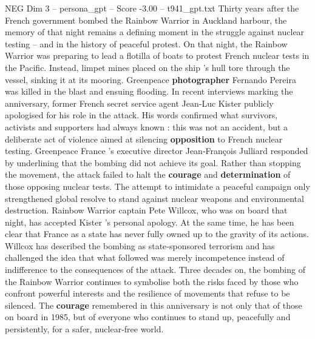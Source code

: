 \begin{textsample}{NEG Dim 3 – persona\_gpt – Score -3.00 – t941\_gpt.txt}  \label{ex:f3_neg_031}
Thirty years after the French government bombed the Rainbow Warrior in Auckland harbour, the memory of that night remains a defining moment in the struggle against nuclear testing – and in the history of peaceful protest.
On that night, the Rainbow Warrior was preparing to lead a flotilla of boats to protest French nuclear tests in the Pacific.
Instead, limpet mines placed on the ship ’s hull tore through the vessel, sinking it at its mooring.
Greenpeace \textbf{photographer} Fernando Pereira was killed in the blast and ensuing flooding.
In recent interviews marking the anniversary, former French secret service agent Jean‑Luc Kister publicly apologised for his role in the attack.
His words confirmed what survivors, activists and supporters had always known : this was not an accident, but a deliberate act of violence aimed at silencing \textbf{opposition} to French nuclear testing.
Greenpeace France ’s executive director Jean‑François Julliard responded by underlining that the bombing did not achieve its goal.
Rather than stopping the movement, the attack failed to halt the \textbf{courage} and \textbf{determination} of those opposing nuclear tests.
The attempt to intimidate a peaceful campaign only strengthened global resolve to stand against nuclear weapons and environmental destruction.
Rainbow Warrior captain Pete Willcox, who was on board that night, has accepted Kister ’s personal apology.
At the same time, he has been clear that France as a state has never fully owned up to the gravity of its actions.
Willcox has described the bombing as state‑sponsored terrorism and has challenged the idea that what followed was merely incompetence instead of indifference to the consequences of the attack.
Three decades on, the bombing of the Rainbow Warrior continues to symbolise both the risks faced by those who confront powerful interests and the resilience of movements that refuse to be silenced.
The \textbf{courage} remembered in this anniversary is not only that of those on board in 1985, but of everyone who continues to stand up, peacefully and persistently, for a safer, nuclear‑free world.

\end{textsample}
